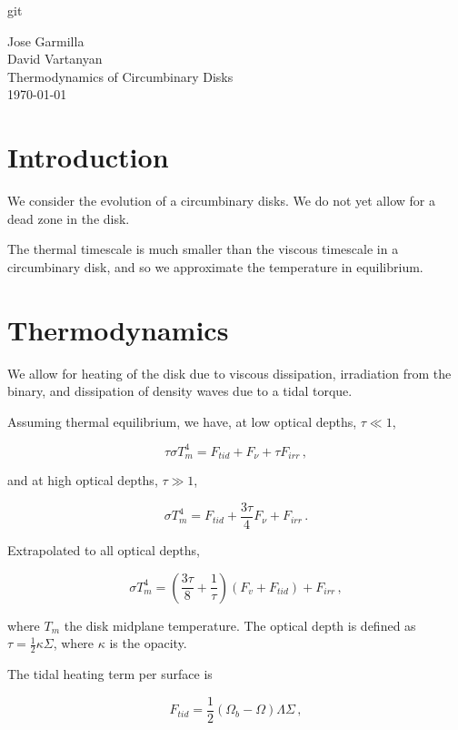 git\documentclass{article}
\begin{document}
\begin{flushleft}
Jose Garmilla \\
David Vartanyan\\
Thermodynamics of Circumbinary Disks\\
\today\\
\end{flushleft}
\section{Introduction}
We consider the evolution of a circumbinary disks. We do not yet allow for a dead zone in the disk.

The thermal timescale is much smaller than the viscous timescale in a circumbinary disk, and so we approximate the temperature in equilibrium.

\section{Thermodynamics}
We allow for heating of the disk due to viscous dissipation, irradiation from the binary, and dissipation of density waves due to a tidal torque.

Assuming thermal equilibrium, we have, at low optical depths, $\tau \ll 1$,

\begin{equation}
\tau \sigma T_m^4 = F_{tid} + F_{\nu} + \tau F_{irr}\,,
\end{equation}

and at high optical depths, $\tau \gg 1$,

\begin{equation}
\sigma T_m^4 = F_{tid} + \frac{3\tau}{4}  F_\nu + F_{irr}\,.
\end{equation}

Extrapolated to all optical depths,

\begin{equation} \label{eq:encon}
\sigma T_m^4= \left(\frac{3\tau}{8} + \frac{1}{\tau}\right) \left(F_{v} + F_{tid}\right) + F_{irr}\,,
\end{equation}

where $T_m$ the disk midplane temperature. The optical depth is defined as $\tau =\frac{1}{2} \kappa \Sigma$, where $\kappa$ is the opacity.

The tidal heating term per surface is

\begin{equation}
F_{tid} = \frac{1}{2}\left(\Omega_b - \Omega\right) \Lambda \Sigma\,,
\end{equation}
\end{document}
